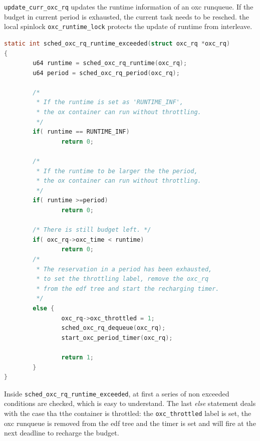 \texttt{update\_curr\_oxc\_rq} updates the runtime information of 
an oxc runqueue. If the budget in current period is exhausted, the
current task needs to be resched. the local spinlock 
\texttt{oxc\_runtime\_lock} protects the update of runtime from
interleave.
\begin{lstlisting}[language=C]
static int sched_oxc_rq_runtime_exceeded(struct oxc_rq *oxc_rq)
{
        u64 runtime = sched_oxc_rq_runtime(oxc_rq);
        u64 period = sched_oxc_rq_period(oxc_rq);

        /* 
         * If the runtime is set as 'RUNTIME_INF',
         * the ox container can run without throttling.
         */
        if( runtime == RUNTIME_INF)
                return 0;

        /* 
         * If the runtime to be larger the the period,
         * the ox container can run without throttling.
         */
        if( runtime >=period)
                return 0;

        /* There is still budget left. */
        if( oxc_rq->oxc_time < runtime)
                return 0;
        /* 
         * The reservation in a period has been exhausted,
         * to set the throttling label, remove the oxc_rq
         * from the edf tree and start the recharging timer.
         */
        else {
                oxc_rq->oxc_throttled = 1;
                sched_oxc_rq_dequeue(oxc_rq);
                start_oxc_period_timer(oxc_rq);

                return 1;
        }
}
\end{lstlisting}
Inside \texttt{sched\_oxc\_rq\_runtime\_exceeded}, at first
a series of non exceeded conditions are checked, which is 
easy to understand. The last \emph{else} statement deals with
the case tha tthe container is throttled: the \texttt{oxc\_throttled}
label is set, the oxc runqueue is removed from the edf tree and 
the timer is set and will fire at the next deadline to recharge the 
budget.

